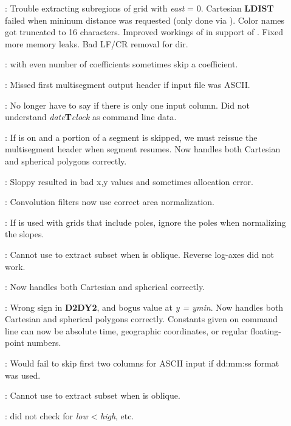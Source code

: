 \begin{description}
\item []: Trouble extracting subregions of grid with {\it east} = 0.  Cartesian {\bf LDIST} failed
when mininum distance was requested (only done via ).  Color names got truncated to 16 characters.
Improved workings of  in support of .  Fixed more memory leaks.
Bad LF/CR removal for  dir.
\item []:  with even number of coefficients sometimes skip a coefficient.
\item []: Missed first multisegment output header if input file was ASCII.
\item []: No longer have to say  if there is only one input column.  Did not understand
{\it date}{\bf T}{\it clock} as command line data.
\item []: If  is on and a portion of a segment is skipped, we must
reissue the multisegment header when segment resumes.  Now handles both Cartesian
and spherical polygons correctly.
\item []: Sloppy  resulted in bad x,y values and sometimes allocation error.
\item []: Convolution filters now use correct area normalization.
\item []: If  is used with grids that include poles, ignore the poles
when normalizing the slopes.
\item []: Cannot use  to extract subset when  is oblique.  Reverse log-axes did not work.
\item []: Now handles both Cartesian and spherical correctly.
\item []: Wrong sign in {\bf D2DY2}, and bogus value at {\it y = ymin}.  Now handles both Cartesian
and spherical polygons correctly.  Constants given on command line can now be absolute time, geographic coordinates, or
regular floating-point numbers.
\item []: Would fail to skip first two columns for ASCII input if dd:mm:ss format was used.
\item []: Cannot use  to extract subset when  is oblique.
\item []:  did not check for {\it low} < {\it high}, etc.

\end{description}
